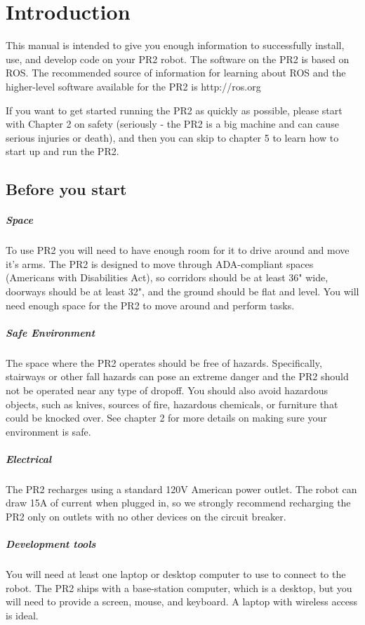\chapter {Introduction}
This manual is intended to give you enough information to successfully install, use, and develop code on your PR2 robot.  The software on the PR2 is based on ROS.  The recommended source of information for learning about ROS and the higher-level software available for the PR2 is http://ros.org

If you want to get started running the PR2 as quickly as possible, please start with Chapter 2 on safety (seriously - the PR2 is a big machine and can cause serious injuries or death), and then you can skip to chapter 5 to learn how to start up and run the PR2.

\section{Before you start}
\paragraph{Space} To use PR2 you will need to have enough room for it to drive around and move it's arms.  The PR2 is designed to move through ADA-compliant spaces (Americans with Disabilities Act), so corridors should be at least 36" wide, doorways should be at least 32", and the ground should be flat and level.  You will need enough space for the PR2 to move around and perform tasks.
\paragraph{Safe Environment} The space where the PR2 operates should be free of hazards.  Specifically, stairways or other fall hazards can pose an extreme danger and the PR2 should not be operated near any type of dropoff.  You should also avoid hazardous objects, such as knives, sources of fire, hazardous chemicals, or furniture that could be knocked over.  See chapter 2 for more details on making sure your environment is safe.
\paragraph{Electrical} The PR2 recharges using a standard 120V American power outlet.  The robot can draw 15A of current when plugged in, so we strongly recommend recharging the PR2 only on outlets with no other devices on the circuit breaker.
\paragraph{Development tools}
You will need at least one laptop or desktop computer to use to connect to the robot.  The PR2 ships with a base-station computer, which is a desktop, but you will need to provide a screen, mouse, and keyboard.  A laptop with wireless access is ideal.
